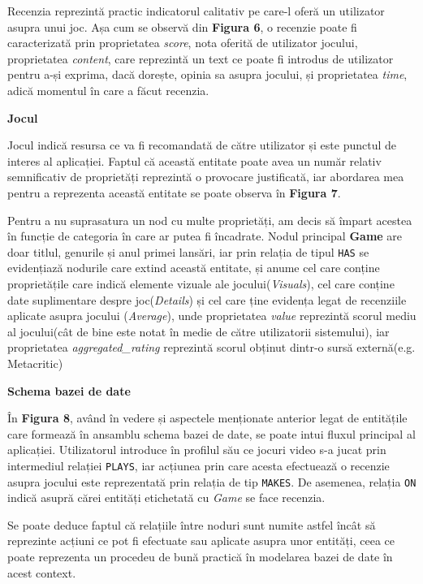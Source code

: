 \documentclass[12pt,a4paper]{report}
\begin{document}
Recenzia reprezintă practic indicatorul calitativ pe care-l oferă un utilizator asupra unui joc. Așa cum se observă din 
\textbf{Figura 6}, o recenzie poate fi caracterizată prin proprietatea \emph{score}, nota oferită de utilizator jocului, proprietatea \emph{content}, care reprezintă un text ce poate fi introdus de utilizator pentru a-și exprima, dacă dorește, opinia sa asupra jocului, și proprietatea \emph{time}, adică momentul în care a făcut recenzia.

\bigskip
\textbf{Jocul}
\bigskip

Jocul indică resursa ce va fi recomandată de către utilizator și este punctul de interes al aplicației. Faptul că această entitate poate avea un număr relativ semnificativ de proprietăți reprezintă o provocare justificată, iar abordarea mea pentru a reprezenta această entitate se poate observa în 
\textbf{Figura 7}.


Pentru a nu suprasatura un nod cu multe proprietăți, am decis să împart acestea în funcție de categoria în care ar putea fi încadrate. Nodul principal \textbf{Game} are doar titlul, genurile și anul primei lansări, iar prin relația de tipul \texttt{HAS} se evidențiază nodurile care extind această entitate, și anume cel care conține proprietățile care indică elemente vizuale ale jocului(\emph{Visuals}), cel care conține date suplimentare despre joc(\emph{Details}) și cel care ține evidența legat de recenziile aplicate asupra jocului (\emph{Average}), unde proprietatea \emph{value} reprezintă scorul mediu al jocului(cât de bine este notat în medie de către utilizatorii sistemului), iar proprietatea \emph{aggregated\_rating} reprezintă scorul obținut dintr-o sursă externă(e.g. Metacritic)

\bigskip
\textbf{Schema bazei de date}
\bigskip

În \textbf{Figura 8}, având în vedere și aspectele menționate anterior legat de entitățile care formează în ansamblu schema bazei de date, se poate intui fluxul principal al aplicației. Utilizatorul introduce în profilul său ce jocuri video s-a jucat prin intermediul relației \texttt{PLAYS}, iar acțiunea prin care acesta efectuează o recenzie asupra jocului este reprezentată prin relația de tip \texttt{MAKES}. De asemenea, relația \texttt{ON} indică asupră cărei entități etichetată cu \emph{Game} se face recenzia.

Se poate deduce faptul că relațiile între noduri sunt numite astfel încât să reprezinte acțiuni ce pot fi efectuate sau aplicate asupra unor entități, ceea ce poate reprezenta un procedeu de bună practică în modelarea bazei de date în acest context. \cite{11}
\end{document}

